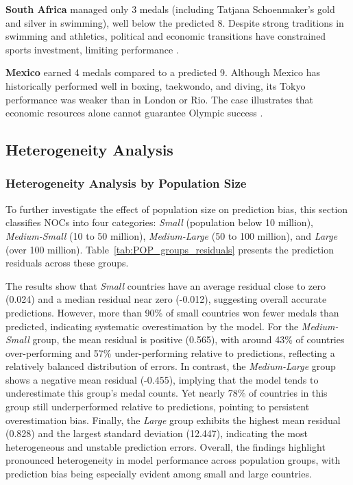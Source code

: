 \documentclass[11pt,twoside]{article}
\numberwithin{Theorem}{section}
\numberwithin{Definition}{section}
\numberwithin{Lemma}{section}
\numberwithin{Algorithm}{section}
\numberwithin{equation}{section}
\begin{document}
\textbf{South Africa} managed only 3 medals (including Tatjana Schoenmaker’s gold and silver in swimming), well below the predicted 8. Despite strong traditions in swimming and athletics, political and economic transitions have constrained sports investment, limiting performance \citep{burnett2010}.  

\textbf{Mexico} earned 4 medals compared to a predicted 9. Although Mexico has historically performed well in boxing, taekwondo, and diving, its Tokyo performance was weaker than in London or Rio. The case illustrates that economic resources alone cannot guarantee Olympic success \citep{bellos2016}.  

\subsection{Heterogeneity Analysis}
\subsubsection{Heterogeneity Analysis by Population Size}

To further investigate the effect of population size on prediction bias, this section classifies NOCs into four categories: \textit{Small} (population below 10 million), \textit{Medium-Small} (10 to 50 million), \textit{Medium-Large} (50 to 100 million), and \textit{Large} (over 100 million). Table~\ref{tab:POP_groups_residuals} presents the prediction residuals across these groups.  

The results show that \textit{Small} countries have an average residual close to zero (0.024) and a median residual near zero (-0.012), suggesting overall accurate predictions. However, more than 90\% of small countries won fewer medals than predicted, indicating systematic overestimation by the model. For the \textit{Medium-Small} group, the mean residual is positive (0.565), with around 43\% of countries over-performing and 57\% under-performing relative to predictions, reflecting a relatively balanced distribution of errors. In contrast, the \textit{Medium-Large} group shows a negative mean residual (-0.455), implying that the model tends to underestimate this group’s medal counts. Yet nearly 78\% of countries in this group still underperformed relative to predictions, pointing to persistent overestimation bias. Finally, the \textit{Large} group exhibits the highest mean residual (0.828) and the largest standard deviation (12.447), indicating the most heterogeneous and unstable prediction errors. Overall, the findings highlight pronounced heterogeneity in model performance across population groups, with prediction bias being especially evident among small and large countries.  
\end{document}
